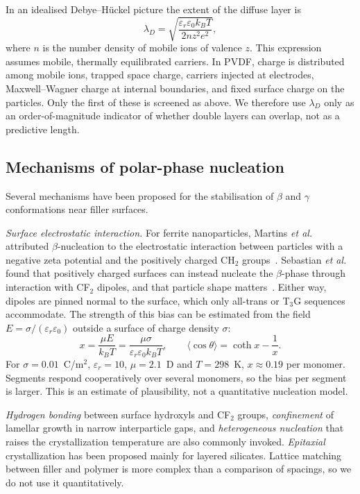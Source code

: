 \documentclass[11pt,a4paper]{article}
\begin{document}
In an idealised Debye--H\"uckel picture the extent of the diffuse layer is
\begin{equation}
\lambda_D=\sqrt{\frac{\varepsilon_r\varepsilon_0k_BT}{2nz^2e^2}},
\end{equation}
where $n$ is the number density of mobile ions of valence $z$. This expression assumes mobile, thermally equilibrated carriers. In PVDF, charge is distributed among mobile ions, trapped space charge, carriers injected at electrodes, Maxwell--Wagner charge at internal boundaries, and fixed surface charge on the particles. Only the first of these is screened as above. We therefore use $\lambda_D$ only as an order-of-magnitude indicator of whether double layers can overlap, not as a predictive length.

\subsection{Mechanisms of polar-phase nucleation}
Several mechanisms have been proposed for the stabilisation of $\beta$ and $\gamma$ conformations near filler surfaces.

\emph{Surface electrostatic interaction.} For ferrite nanoparticles, Martins \emph{et al.} attributed $\beta$-nucleation to the electrostatic interaction between particles with a negative zeta potential and the positively charged CH$_2$ groups~\cite{Martins2012}. Sebastian \emph{et al.} found that positively charged surfaces can instead nucleate the $\beta$-phase through interaction with CF$_2$ dipoles, and that particle shape matters~\cite{Sebastian2016}. Either way, dipoles are pinned normal to the surface, which only all-trans or T$_3$G sequences accommodate. The strength of this bias can be estimated from the field $E=\sigma/(\varepsilon_r\varepsilon_0)$ outside a surface of charge density $\sigma$:
\begin{equation}
x=\frac{\mu E}{k_BT}=\frac{\mu\sigma}{\varepsilon_r\varepsilon_0k_BT},\qquad \langle\cos\theta\rangle=\coth x-\frac1x .
\end{equation}
For $\sigma=0.01$~C/m$^2$, $\varepsilon_r=10$, $\mu=2.1$~D and $T=298$~K, $x\approx0.19$ per monomer. Segments respond cooperatively over several monomers, so the bias per segment is larger. This is an estimate of plausibility, not a quantitative nucleation model.

\emph{Hydrogen bonding} between surface hydroxyls and CF$_2$ groups, \emph{confinement} of lamellar growth in narrow interparticle gaps, and \emph{heterogeneous nucleation} that raises the crystallization temperature are also commonly invoked. \emph{Epitaxial} crystallization has been proposed mainly for layered silicates. Lattice matching between filler and polymer is more complex than a comparison of spacings, so we do not use it quantitatively.
\end{document}
